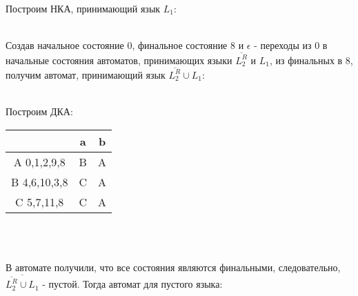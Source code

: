 \documentclass[10pt]{amsart}
\theoremstyle{plain}
\theoremstyle{remark}
\theoremstyle{definition}
\begin{document}
\begin{enumerate}
Построим НКА, принимающий язык $L_1$:\\
\begin{figure}[h]
\end{figure}\\
Создав начальное состояние 0, финальное состояние 8 и $\epsilon$ - переходы из 0 в начальные состояния автоматов, принимающих языки $\overline{L_2^R}$ и $L_1$, из финальных в 8, получим автомат, принимающий язык $\overline{L_2^R} \cup L_1$:\\
\begin{figure}[h]
\end{figure}\\
\newpage
Построим ДКА:\\
\begin{tabular}{|c|c|c|}
    \hline
     & a & b  \\
   \hline
    A 0,1,2,9,8 & B & A \\
   \hline
  B 4,6,10,3,8 & C & A\\
   \hline
   C 5,7,11,8 & C & A\\
    \hline\end{tabular}\\
\begin{figure}[h]
\end{figure}\\
В автомате получили, что все состояния являются финальными, следовательно, $\overline{\overline{L_2^R}\cup L_1}$ - пустой.
Тогда автомат для пустого языка:\\
\begin{figure}[h]
\end{figure}\\
\end{enumerate}
\end{document}
